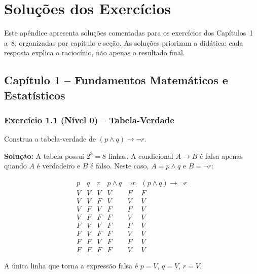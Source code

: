 \chapter{Soluções dos Exercícios}\label{ap:solucoes}

Este apêndice apresenta soluções comentadas para os exercícios dos Capítulos~1
a~8, organizadas por capítulo e seção. As soluções priorizam a didática: cada
resposta explica o raciocínio, não apenas o resultado final.

\section*{Capítulo 1 -- Fundamentos Matemáticos e Estatísticos}

\subsection*{Exercício 1.1 (Nível 0) -- Tabela-Verdade}
Construa a tabela-verdade de $(p \land q) \to \neg r$.

\textbf{Solução:} A tabela possui $2^3 = 8$ linhas. A condicional
$A \to B$ é falsa apenas quando $A$ é verdadeiro e $B$ é falso.
Neste caso, $A = p \land q$ e $B = \neg r$:

\[
\begin{array}{ccc|c|c|c}
p & q & r & p \land q & \neg r & (p \land q) \to \neg r \\ \hline
V & V & V & V & F & F \\
V & V & F & V & V & V \\
V & F & V & F & F & V \\
V & F & F & F & V & V \\
F & V & V & F & F & V \\
F & V & F & F & V & V \\
F & F & V & F & F & V \\
F & F & F & F & V & V
\end{array}
\]

A única linha que torna a expressão falsa é $p=V$, $q=V$, $r=V$.

